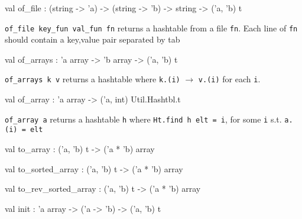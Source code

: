 \documentclass[11pt]{article}
\begin{document}
\begin{ocamldocsigend}
\label{val:Util.Ht.of-underscorefile}\begin{ocamldoccode}
val of_file : (string -> 'a) -> (string -> 'b) -> string -> ('a, 'b) t
\end{ocamldoccode}
\begin{ocamldocdescription}
{\tt{of\_file key\_fun val\_fun fn}} returns a hashtable from a file {\tt{fn}}.  Each line of 
{\tt{fn}} should contain a key,value pair separated by tab


\end{ocamldocdescription}


\label{val:Util.Ht.of-underscorearrays}\begin{ocamldoccode}
val of_arrays : 'a array -> 'b array -> ('a, 'b) t
\end{ocamldoccode}
\begin{ocamldocdescription}
{\tt{of\_arrays k v}} returns a hashtable where {\tt{k.(i)}} $\rightarrow$ {\tt{v.(i)}} for each {\tt{i}}.


\end{ocamldocdescription}


\label{val:Util.Ht.of-underscorearray}\begin{ocamldoccode}
val of_array : 'a array -> ('a, int) Util.Hashtbl.t
\end{ocamldoccode}
\begin{ocamldocdescription}
{\tt{of\_array a}} returns a hashtable {\tt{h}} where {\tt{Ht.find h elt = i}}, for some {\tt{i}} s.t. {\tt{a.(i) = elt}}


\end{ocamldocdescription}


\label{val:Util.Ht.to-underscorearray}\begin{ocamldoccode}
val to_array : ('a, 'b) t -> ('a * 'b) array
\end{ocamldoccode}


\label{val:Util.Ht.to-underscoresorted-underscorearray}\begin{ocamldoccode}
val to_sorted_array : ('a, 'b) t -> ('a * 'b) array
\end{ocamldoccode}


\label{val:Util.Ht.to-underscorerev-underscoresorted-underscorearray}\begin{ocamldoccode}
val to_rev_sorted_array : ('a, 'b) t -> ('a * 'b) array
\end{ocamldoccode}


\label{val:Util.Ht.init}\begin{ocamldoccode}
val init : 'a array -> ('a -> 'b) -> ('a, 'b) t
\end{ocamldoccode}
\end{ocamldocsigend}
\end{document}
